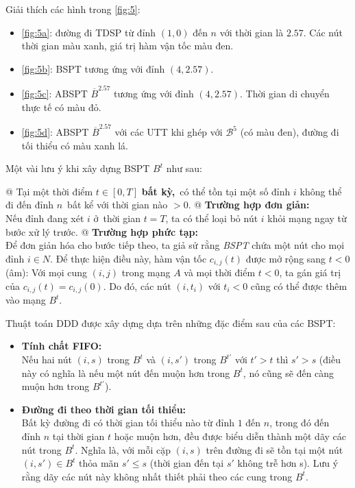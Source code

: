 \documentclass[../main.tex]{subfiles}
\begin{document}
\newpage
Giải thích các hình trong \autoref{fig:5}: 
\begin{itemize}
  \item \autoref{fig:5a}: đường đi TDSP từ đỉnh \((1, 0)\) đến \(n\) với thời gian là \(2.57\). 
  Các nút thời gian màu xanh, giá trị hàm vận tốc màu đen.
  \item \autoref{fig:5b}: BSPT tương ứng với đỉnh \((4, 2.57)\).
  \item \autoref{fig:5c}: ABSPT \(\overline{B}^{2.57}\) tương ứng với đỉnh \((4, 2.57)\). 
  Thời gian di chuyển thực tế có màu đỏ.
  \item \autoref{fig:5d}: ABSPT \(\overline{B}^{2.57}\) với các UTT khi ghép với \(\mathcal{B}^5\) (có màu đen),
  đường đi tối thiểu có màu xanh lá.
\end{itemize}

Một vài lưu ý khi xây dựng BSPT \(B^t\) như sau:

\begin{easylist}[itemize]

  @ Tại một thời điểm \(t \in [0, T]\) \textbf{bất kỳ,}~có thể tồn tại một
  số đỉnh \(i\) không thể đi đến đỉnh \(n\)~bất kể với thời gian nào
  \(> 0\).
  @ \textbf{Trường hợp đơn giản:}\\
  Nếu đỉnh đang xét \(i\) ở~thời gian
  \(t = T\), ta có thể loại bỏ nút \(i\) khỏi mạng ngay từ bước xử lý
  trước.
  @ \textbf{Trường hợp phức tạp:}\\
  Để đơn giản hóa cho bước tiếp theo, ta
  giả sử rằng \emph{BSPT} chứa một nút cho mọi đỉnh \(i \in N\). Để thực
  hiện điều này, hàm vận tốc \(c_{i,j}(t)\) được mở rộng
  sang \(t < 0\) (âm): Với mọi cung \((i, j)\) trong mạng \(A\) và mọi
  thời điểm \(t < 0\), ta gán giá trị của \(c_{i,j}(t) = c_{i,j}(0)\).
  Do đó, các nút \((i, t_i)\) với \(t_i<0\) cũng có thể được thêm vào
  mạng \(B^t\).
\end{easylist}

Thuật toán DDD được xây dựng dựa trên những đặc điểm sau của các BSPT: 
\begin{itemize}
  \tightlist
  \item
    \textbf{Tính chất FIFO:}\\ 
    Nếu hai nút \((i, s)\) trong \(B^t\) và
    \((i, s')\) trong \(B^{t'}\) với \(t' > t\) thì \(s' > s\) (điều này
    có nghĩa là nếu một nút đến muộn hơn trong \(B^t\), nó cũng sẽ đến
    càng muộn hơn trong \(B^{t'}\)).
  \item
    \textbf{Đường đi theo thời gian tối thiểu:} \\
    Bất kỳ đường đi có thời
    gian tối thiểu nào từ đỉnh \(1\) đến \(n\), trong đó đến đỉnh \(n\)
    tại thời gian \(t\) hoặc muộn hơn, đều được biểu diễn thành một dãy
    các nút trong \(B^t\). Nghĩa là, với mỗi cặp \((i, s)\) trên đường đi
    sẽ tồn tại một nút \((i, s') \in B^t\) thỏa mãn \(s' \le s\) (thời
    gian đến tại \(s'\) không trễ hơn s). Lưu ý rằng dãy các nút này không
    nhất thiết phải theo các cung trong \(B^t\).
  \end{itemize}
\end{document}
